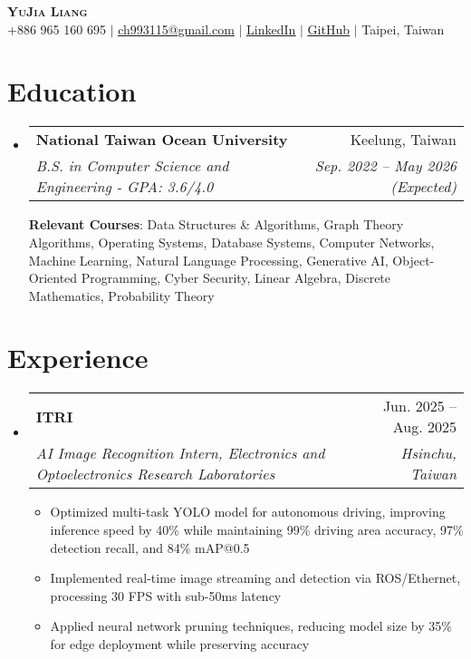 \documentclass[letterpaper,11pt]{article}
\makeatletter
\newcommand{\resumeItem}[1]{
  \item\small{
    {#1 \vspace{-3pt}}
  }
}
\newcommand{\resumeSubheading}[4]{
  \vspace{-3pt}\item
    \begin{tabular*}{0.97\textwidth}[t]{l@{\extracolsep{\fill}}r}
      \textbf{#1} & #2 \\
      \textit{\small#3} & \textit{\small #4} \\
    \end{tabular*}\vspace{-8pt}
}
\newcommand{\resumeSubHeadingListStart}{\begin{itemize}[leftmargin=0.15in, label={}]}
\newcommand{\resumeSubHeadingListEnd}{\end{itemize}}
\newcommand{\resumeItemListStart}{\begin{itemize}}
\newcommand{\resumeItemListEnd}{\end{itemize}\vspace{-6pt}}
\makeatother
\begin{document}
\begin{center}
    \textbf{\Huge \scshape YuJia Liang} \\ \vspace{1pt}
    \small +886 965 160 695 $|$ \href{mailto:ch993115@gmail.com}{\underline{ch993115@gmail.com}} $|$ \href{https://linkedin.com/in/yujia-liang-77ab022a7}{\underline{LinkedIn}} $|$ \href{https://github.com/itsYoga}{\underline{GitHub}} $|$ {\small{Taipei, Taiwan}}
\end{center}


\section{Education}
  \resumeSubHeadingListStart
    \resumeSubheading
      {National Taiwan Ocean University}{Keelung, Taiwan}
      {B.S. in Computer Science and Engineering - GPA: 3.6/4.0}{Sep. 2022 -- May 2026 (Expected)}

  \vspace{2pt}
  \small{\textbf{Relevant Courses}: Data Structures \& Algorithms, Graph Theory Algorithms, Operating Systems, Database Systems, Computer Networks, Machine Learning, Natural Language Processing, Generative AI, Object-Oriented Programming, Cyber Security, Linear Algebra, Discrete Mathematics, Probability Theory}
  
  \resumeSubHeadingListEnd


\section{Experience}
    \resumeSubHeadingListStart
      \resumeSubheading
        {ITRI}{Jun. 2025 -- Aug. 2025}
        {\textit{AI Image Recognition Intern, Electronics and Optoelectronics Research Laboratories}}{Hsinchu, Taiwan}
        \resumeItemListStart
            \resumeItem{Optimized multi-task YOLO model for autonomous driving, improving inference speed by 40\% while maintaining 99\% driving area accuracy, 97\% detection recall, and 84\% mAP@0.5}
            \resumeItem{Implemented real-time image streaming and detection via ROS/Ethernet, processing 30 FPS with sub-50ms latency}
            \resumeItem{Applied neural network pruning techniques, reducing model size by 35\% for edge deployment while preserving accuracy}
        \resumeItemListEnd
    \resumeSubHeadingListEnd


\end{document}
